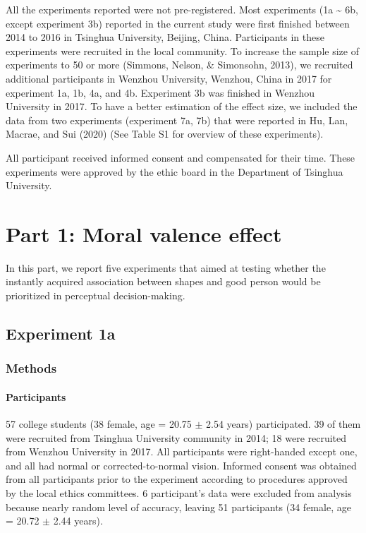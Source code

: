 \documentclass[
  english,
  man]{apa6}
\let\oldparagraph\paragraph
\renewcommand{\paragraph}[1]{\oldparagraph{#1}\mbox{}}
\begin{document}
All the experiments reported were not pre-registered. Most experiments (1a \textasciitilde{} 6b, except experiment 3b) reported in the current study were first finished between 2014 to 2016 in Tsinghua University, Beijing, China. Participants in these experiments were recruited in the local community. To increase the sample size of experiments to 50 or more (Simmons, Nelson, \& Simonsohn, 2013), we recruited additional participants in Wenzhou University, Wenzhou, China in 2017 for experiment 1a, 1b, 4a, and 4b. Experiment 3b was finished in Wenzhou University in 2017. To have a better estimation of the effect size, we included the data from two experiments (experiment 7a, 7b) that were reported in Hu, Lan, Macrae, and Sui (2020) (See Table S1 for overview of these experiments).

All participant received informed consent and compensated for their time. These experiments were approved by the ethic board in the Department of Tsinghua University.

\hypertarget{part-1-moral-valence-effect}{%
\section{Part 1: Moral valence effect}\label{part-1-moral-valence-effect}}

In this part, we report five experiments that aimed at testing whether the instantly acquired association between shapes and good person would be prioritized in perceptual decision-making.

\hypertarget{experiment-1a}{%
\subsection{Experiment 1a}\label{experiment-1a}}

\hypertarget{methods}{%
\subsubsection{Methods}\label{methods}}

\hypertarget{participants}{%
\paragraph{Participants}\label{participants}}

57 college students (38 female, age = 20.75 \(\pm\) 2.54 years) participated. 39 of them were recruited from Tsinghua University community in 2014; 18 were recruited from Wenzhou University in 2017. All participants were right-handed except one, and all had normal or corrected-to-normal vision. Informed consent was obtained from all participants prior to the experiment according to procedures approved by the local ethics committees. 6 participant's data were excluded from analysis because nearly random level of accuracy, leaving 51 participants (34 female, age = 20.72 \(\pm\) 2.44 years).
\end{document}
